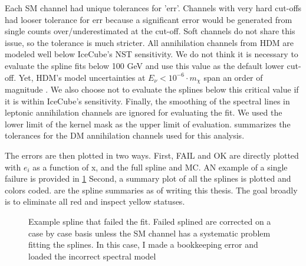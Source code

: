 Each SM channel had unique tolerances for 'err'.
Channels with very hard cut-offs had looser tolerance for err because a significant error would be generated from single counts over/underestimated at the cut-off.
Soft channels do not share this issue, so the tolerance is much stricter.
All annihilation channels from HDM are modeled well below IceCube's NST sensitivity.
We do not think it is necessary to evaluate the spline fits below 100 GeV \cite{IC3_thesis_Cerver} and use this value as the default lower cut-off.
Yet, HDM's model uncertainties at $E_\nu < 10^{-6}\cdot m_\chi$ span an order of magnitude \cite{HDMSpectra}.
We also choose not to evaluate the splines below this critical value if it is within IceCube's sensitivity.
Finally, the smoothing of the spectral lines in leptonic annihilation channels are ignored for evaluating the fit.
We used the lower limit of the kernel mask as the upper limit of evaluation.
 summarizes the tolerances for the DM annihilation channels used for this analysis.


The errors are then plotted in two ways.
First, FAIL and OK are directly plotted with $e_i$ as a function of x, and the full spline and MC.
AN example of a single failure is provided in \cref{fig:icDM_failedspline}
Second, a summary plot of all the splines is plotted and colors coded.
 are the spline summaries as of writing this thesis.
The goal broadly is to eliminate all red and inspect yellow statuses.

\begin{figure}
    \caption{Example spline that failed the fit. Failed splined are corrected on a case by case basis unless the SM channel has a systematic problem fitting the splines. In this case, I made a bookkeeping error and loaded the incorrect spectral model}
    \label{fig:icDM_failedspline}
\end{figure}

